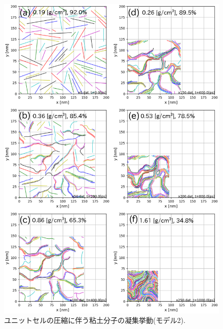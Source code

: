 \begin{figure}[h]
	\begin{center}
	\includegraphics[width=1.0\linewidth]{Figs/fig4.eps} 
	\end{center}
	\caption{
		ユニットセルの圧縮に伴う粘土分子の凝集挙動(モデル2).
	} 
	\label{fig:fig4}
\end{figure}
